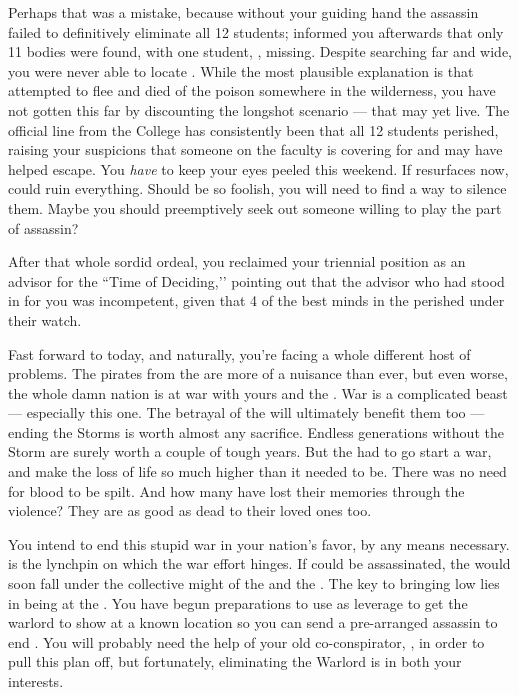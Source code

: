 \documentclass[char]{GL2020}
\begin{document}
Perhaps that was a mistake, because without your guiding hand the assassin failed to definitively eliminate all 12 students; \cDiplomat{} informed you afterwards that only 11 bodies were found, with one student, \cKidScientist{\full}, missing. Despite searching far and wide, you were never able to locate \cKidScientist{\them}. While the most plausible explanation is that \cKidScientist{\they} attempted to flee and died of the poison somewhere in the wilderness, you have not gotten this far by discounting the longshot scenario — that \cKidScientist{} may yet live. The official line from the College has consistently been that all 12 students perished, raising your suspicions that someone on the faculty is covering for \cKidScientist{} and may have helped \cKidScientist{\them} escape. You \emph{have} to keep your eyes peeled this weekend. If \cKidScientist{} resurfaces now, \cKidScientst{\they} could ruin everything. Should \cKidScientist{\they} be so foolish, you will need to find a way to silence them. Maybe you should preemptively seek out someone willing to play the part of assassin? 

After that whole sordid ordeal, you reclaimed your triennial position as an advisor for the ``Time of Deciding,’’ pointing out that the advisor who had stood in for you was incompetent, given that 4 of the best minds in the \pFarm{} perished under their watch.

Fast forward to today, and naturally, you’re facing a whole different host of problems. The pirates from the \pShip{} are more of a nuisance than ever, but even worse, the whole damn nation is at war with yours and the \pTech{}. War is a complicated beast — especially this one. The betrayal of the \pShip{} will ultimately benefit them too — ending the Storms is worth almost any sacrifice. Endless generations without the Storm are surely worth a couple of tough years. But the \pShip{} had to go start a war, and make the loss of life so much higher than it needed to be. There was no need for \pFarm{} blood to be spilt. And how many \pShippies{} have lost their memories through the violence? They are as good as dead to their loved ones too. 

You intend to end this stupid war in your nation's favor, by any means necessary. \cLoud{\full} is the lynchpin on which the \pShip{} war effort hinges. If \cLoud{\they} could be assassinated, the \pShip{} would soon fall under the collective might of the \pFarm{} and the \pTech{}. The key to bringing \cLoud{} low lies in \cLoud{\their} \cWarlordDaughter{\offspring} being at the \pSchool{}. You have begun preparations to use \cWarlordDaughter{\them} as leverage to get the warlord to show \cLoud{\themself} at a known location so you can send a pre-arranged assassin to end \cLoud{\them}. You will probably need the help of your old co-conspirator, \cDiplomat{}, in order to pull this plan off, but fortunately, eliminating the Warlord is in both your interests.
\end{document}
